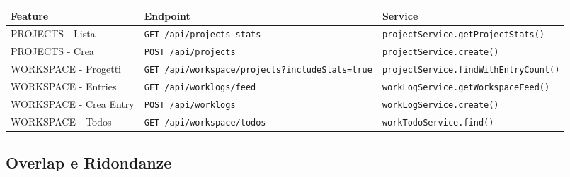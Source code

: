 \documentclass[11pt,a4paper]{article}
\begin{document}
\begin{center}
\begin{tabular}{|l|l|l|}
\hline
\textbf{Feature} & \textbf{Endpoint} & \textbf{Service} \\
\hline
PROJECTS - Lista & \texttt{GET /api/projects-stats} & \texttt{projectService.getProjectStats()} \\
PROJECTS - Crea & \texttt{POST /api/projects} & \texttt{projectService.create()} \\
WORKSPACE - Progetti & \texttt{GET /api/workspace/projects?includeStats=true} & \texttt{projectService.findWithEntryCount()} \\
WORKSPACE - Entries & \texttt{GET /api/worklogs/feed} & \texttt{workLogService.getWorkspaceFeed()} \\
WORKSPACE - Crea Entry & \texttt{POST /api/worklogs} & \texttt{workLogService.create()} \\
WORKSPACE - Todos & \texttt{GET /api/workspace/todos} & \texttt{workTodoService.find()} \\
\hline
\end{tabular}
\end{center}

\subsection{Overlap e Ridondanze}
\end{document}
